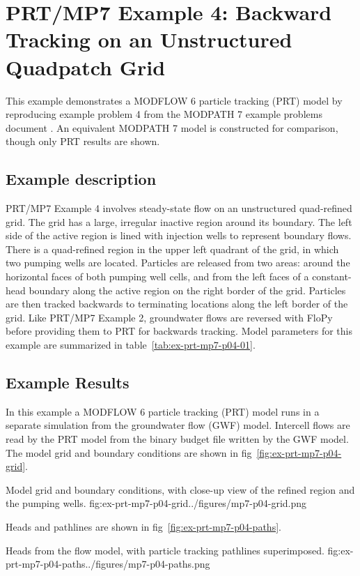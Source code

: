 \section{PRT/MP7 Example 4: Backward Tracking on an Unstructured Quadpatch Grid}

This example demonstrates a MODFLOW 6 particle tracking (PRT) model by reproducing example problem 4 from the MODPATH 7 \citep{pollock2016modpath7} example problems document \citep{modpath7examples}. An equivalent MODPATH 7 model is constructed for comparison, though only PRT results are shown.

\subsection{Example description}

PRT/MP7 Example 4 involves steady-state flow on an unstructured quad-refined grid. The grid has a large, irregular inactive region around its boundary. The left side of the active region is lined with injection wells to represent boundary flows. There is a quad-refined region in the upper left quadrant of the grid, in which two pumping wells are located. Particles are released from two areas: around the horizontal faces of both pumping well cells, and from the left faces of a constant-head boundary along the active region on the right border of the grid. Particles are then tracked backwards to terminating locations along the left border of the grid. Like PRT/MP7 Example 2, groundwater flows are reversed with FloPy before providing them to PRT for backwards tracking. Model parameters for this example are summarized in table~\ref{tab:ex-prt-mp7-p04-01}.



\subsection{Example Results}

In this example a MODFLOW 6 particle tracking (PRT) model runs in a separate simulation from the groundwater flow (GWF) model. Intercell flows are read by the PRT model from the binary budget file written by the GWF model. The model grid and boundary conditions are shown in fig~\ref{fig:ex-prt-mp7-p04-grid}.

\begin{StandardFigure}{
    Model grid and boundary conditions, with close-up view of the refined region and the pumping wells.
    }{fig:ex-prt-mp7-p04-grid}{../figures/mp7-p04-grid.png}
\end{StandardFigure}

Heads and pathlines are shown in fig~\ref{fig:ex-prt-mp7-p04-paths}.

\begin{StandardFigure}{
    Heads from the flow model, with particle tracking pathlines superimposed.
    }{fig:ex-prt-mp7-p04-paths}{../figures/mp7-p04-paths.png}
\end{StandardFigure}